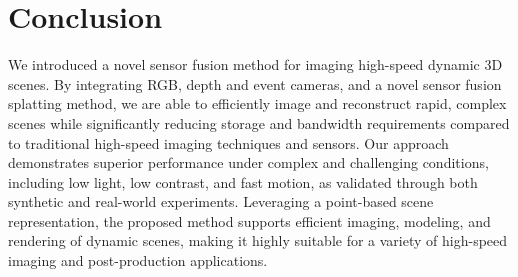 \section{Conclusion}
\label{conclusion}


We introduced a novel sensor fusion method for imaging high-speed dynamic 3D scenes. 
By integrating RGB, depth and event cameras, and a novel sensor fusion splatting method, we are able to efficiently image and reconstruct rapid, complex scenes 
while significantly reducing storage and bandwidth requirements compared to traditional high-speed imaging techniques and sensors.
Our approach demonstrates superior performance under complex and challenging conditions, including low light, low contrast, and fast motion, as validated through both synthetic and real-world experiments.
Leveraging a point-based scene representation, the proposed method supports efficient imaging, modeling, and rendering of dynamic scenes, making it highly suitable for a variety of high-speed imaging and post-production applications.
